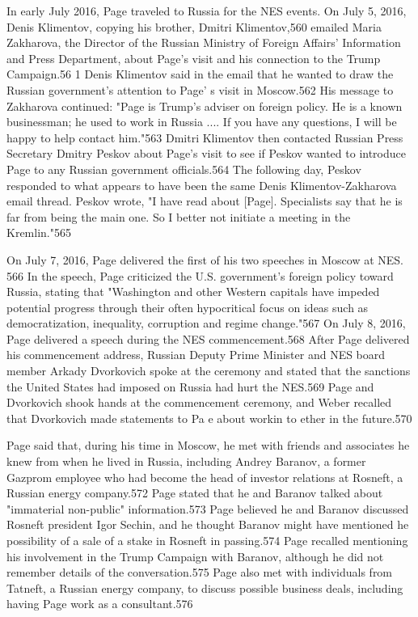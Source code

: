 In early July 2016, Page traveled to Russia for the NES events. On July 5, 2016, Denis Klimentov, copying his brother, Dmitri Klimentov,560 emailed Maria Zakharova, the Director of the Russian Ministry of Foreign Affairs' Information and Press Department, about Page's visit and his connection to the Trump Campaign.56 1 Denis Klimentov said in the email that he wanted to draw the Russian government's attention to Page' s visit in Moscow.562 His message to Zakharova continued: "Page is Trump's adviser on foreign policy.  He is a  known businessman; he used to work in Russia .... If you have any questions, I will be happy to help contact him."563 Dmitri Klimentov then contacted Russian Press Secretary Dmitry Peskov about Page's visit to see if Peskov wanted to introduce Page to any Russian government officials.564 The following day, Peskov responded to what appears to have been the same Denis Klimentov-Zakharova email thread. Peskov wrote, "I have read about [Page]. Specialists say that he is far from being the main one. So I better not initiate a meeting in the Kremlin."565

On July 7, 2016, Page delivered the first of his two speeches in Moscow at NES. 566 In the speech, Page criticized the U.S. government's foreign policy toward Russia, stating that "Washington and other Western capitals have impeded potential progress through their often hypocritical focus on ideas such as democratization, inequality, corruption and regime change."567 On July 8, 2016, Page delivered a speech during the NES commencement.568 After Page delivered his commencement address, Russian Deputy Prime Minister and NES board member Arkady Dvorkovich spoke at the ceremony and stated that the sanctions the United States had imposed on Russia had hurt the NES.569 Page and Dvorkovich shook hands at the commencement ceremony, and Weber recalled that Dvorkovich made statements to Pa e  about workin to ether in the future.570

Page said that,  during his time in Moscow, he met with friends and associates he knew from when he lived in Russia, including Andrey Baranov, a former Gazprom employee who had become the head of investor relations at Rosneft, a Russian energy company.572 Page stated that he and Baranov talked about "immaterial non-public"  information.573 Page believed he and Baranov discussed Rosneft president Igor Sechin, and he thought Baranov might have mentioned he possibility of a  sale of a  stake in Rosneft in passing.574 Page recalled mentioning his involvement in the Trump Campaign with Baranov, although he did not remember details of the conversation.575 Page also met with individuals from Tatneft, a  Russian energy company, to discuss possible business deals, including having Page work as a consultant.576

